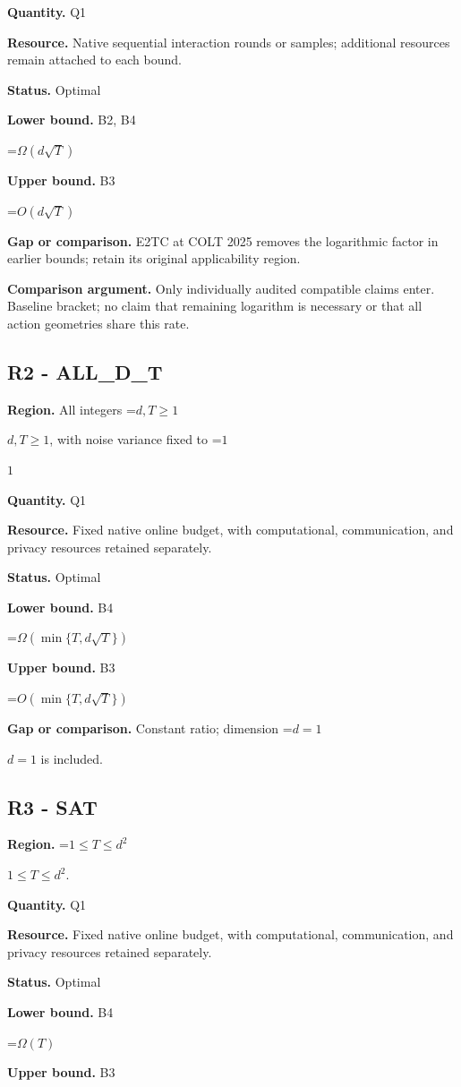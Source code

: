 \documentclass[10pt,a4paper]{article}
\newcommand{\AtlasMath}[1]{\par\begingroup\centering\setbox0=\hbox{$\displaystyle #1$}\ifdim\wd0>1.4\linewidth\typeout{ATLAS WIDE FORMULA: \the\wd0}\fi\ifdim\wd0>\linewidth\resizebox{\linewidth}{!}{\box0}\else\box0\fi\par\endgroup}
\newcommand{\AtlasInlineMath}[1]{\begingroup\setbox0=\hbox{$#1$}\ifdim\wd0>.4\linewidth\endgroup\AtlasMath{#1}\else\endgroup$#1$\fi}
\begin{document}
\textbf{Quantity.} Q1

\textbf{Resource.} Native sequential interaction rounds or samples; additional resources remain attached to each bound.

\textbf{Status.} Optimal

\textbf{Lower bound.} B2, B4

\AtlasMath{\Omega(d\sqrt T)}
\textbf{Upper bound.} B3

\AtlasMath{O(d\sqrt T)}
\textbf{Gap or comparison.} E2TC at COLT 2025 removes the logarithmic factor in earlier bounds; retain its original applicability region.

\textbf{Comparison argument.} Only individually audited compatible claims enter. Baseline bracket; no claim that remaining logarithm is necessary or that all action geometries share this rate.

\subsection{R2 - ALL\_D\_T}
\textbf{Region.} All integers \AtlasInlineMath{d,T\ge1}, with noise variance fixed to \AtlasInlineMath{1}

\textbf{Quantity.} Q1

\textbf{Resource.} Fixed native online budget, with computational, communication, and privacy resources retained separately.

\textbf{Status.} Optimal

\textbf{Lower bound.} B4

\AtlasMath{\Omega(\min\{T,d\sqrt T\})}
\textbf{Upper bound.} B3

\AtlasMath{O(\min\{T,d\sqrt T\})}
\textbf{Gap or comparison.} Constant ratio; dimension \AtlasInlineMath{d=1} is included.

\subsection{R3 - SAT}
\textbf{Region.} \AtlasInlineMath{1\le T\le d^{2}}.

\textbf{Quantity.} Q1

\textbf{Resource.} Fixed native online budget, with computational, communication, and privacy resources retained separately.

\textbf{Status.} Optimal

\textbf{Lower bound.} B4

\AtlasMath{\Omega(T)}
\textbf{Upper bound.} B3
\end{document}
